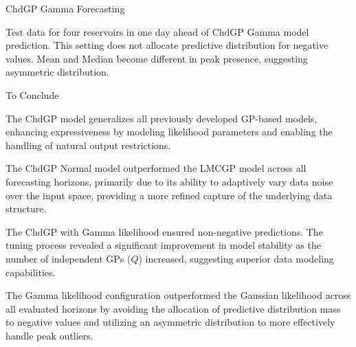 \begin{frame}{ChdGP Gamma Forecasting}
	\centering
	\begin{figure}[htbp]
		\tiny
		\setlength{} 
		\setlength{}
		
		\subfloat[$I.$]{}
		\subfloat[$O.$]{}
	\end{figure}
	\vspace{-1.5em}
	\begin{block}{}
		Test data for four reservoirs in one day ahead of ChdGP Gamma model prediction. This setting does not allocate predictive distribution for negative values. Mean and Median become different in peak presence, suggesting asymmetric distribution.
	\end{block}
\end{frame}

\begin{frame}{To Conclude}
		
		\begin{block}{}
			\justifying
			The ChdGP model generalizes all previously developed GP-based models, enhancing expressiveness by modeling likelihood parameters and enabling the handling of natural output restrictions.	
		\end{block}
		
		\begin{block}{}
			\justifying
			The ChdGP Normal model outperformed the LMCGP model across all forecasting horizons, primarily due to its ability to adaptively vary data noise over the input space, providing a more refined capture of the underlying data structure.
		\end{block}
		
		\begin{block}{}
			\justifying
			The ChdGP with Gamma likelihood ensured non-negative predictions. The tuning process revealed a significant improvement in model stability as the number of independent GPs ($Q$) increased, suggesting superior data modeling capabilities.
		\end{block}
		
		\begin{block}{}
			\justifying
			The Gamma likelihood configuration outperformed the Gaussian likelihood across all evaluated horizons by avoiding the allocation of predictive distribution mass to negative values and utilizing an asymmetric distribution to more effectively handle peak outliers.
		\end{block}
		
\end{frame}

